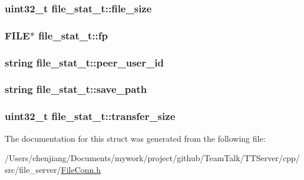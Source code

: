 \subsubsection[{file\+\_\+size}]{\setlength{\rightskip}{0pt plus 5cm}uint32\+\_\+t file\+\_\+stat\+\_\+t\+::file\+\_\+size}\label{structfile__stat__t_a7961401dd2c87e2f249ecd5ca817b007}
\hypertarget{structfile__stat__t_a9fcf91f5f973b48ffa80281f610e4d21}{}
\subsubsection[{fp}]{\setlength{\rightskip}{0pt plus 5cm}F\+I\+L\+E$\ast$ file\+\_\+stat\+\_\+t\+::fp}\label{structfile__stat__t_a9fcf91f5f973b48ffa80281f610e4d21}
\hypertarget{structfile__stat__t_a1f13796c2b28c0f3410e9240cf9fd0d4}{}
\subsubsection[{peer\+\_\+user\+\_\+id}]{\setlength{\rightskip}{0pt plus 5cm}string file\+\_\+stat\+\_\+t\+::peer\+\_\+user\+\_\+id}\label{structfile__stat__t_a1f13796c2b28c0f3410e9240cf9fd0d4}
\hypertarget{structfile__stat__t_a8f4962b17d91d7a0f0b95c5958f30033}{}
\subsubsection[{save\+\_\+path}]{\setlength{\rightskip}{0pt plus 5cm}string file\+\_\+stat\+\_\+t\+::save\+\_\+path}\label{structfile__stat__t_a8f4962b17d91d7a0f0b95c5958f30033}
\hypertarget{structfile__stat__t_aaf6799241960a0d87ebf032548e436cd}{}
\subsubsection[{transfer\+\_\+size}]{\setlength{\rightskip}{0pt plus 5cm}uint32\+\_\+t file\+\_\+stat\+\_\+t\+::transfer\+\_\+size}\label{structfile__stat__t_aaf6799241960a0d87ebf032548e436cd}


The documentation for this struct was generated from the following file\+:\begin{DoxyCompactItemize}
\item 
/\+Users/chenjiang/\+Documents/mywork/project/github/\+Team\+Talk/\+T\+T\+Server/cpp/src/file\+\_\+server/\hyperlink{_file_conn_8h}{File\+Conn.\+h}\end{DoxyCompactItemize}
